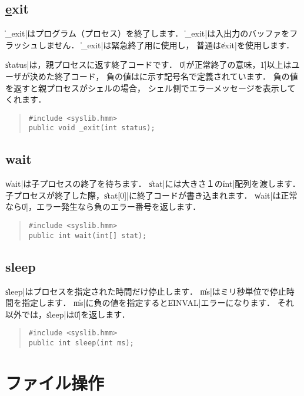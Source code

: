 \subsection{\ul exit}

\|_exit|はプログラム（プロセス）を終了します．
\|_exit|は入出力のバッファをフラッシュしません．
\|_exit|は緊急終了用に使用し，
普通は\|exit|を使用します．

\|status|は，親プロセスに返す終了コードです．
\|0|が正常終了の意味，\|1|以上はユーザが決めた終了コード，
負の値はに示す記号名で定義されています．
負の値を返すと親プロセスがシェルの場合，
シェル側でエラーメッセージを表示してくれます．

\begin{quote}
\begin{verbatim}
#include <syslib.hmm>
public void _exit(int status);
\end{verbatim}
\end{quote}

\subsection{wait}

\|wait|は子プロセスの終了を待ちます．
\|stat|には大きさ１の\|int|配列を渡します．
子プロセスが終了した際，\|stat[0]|に終了コードが書き込まれます．
\|wait|は正常なら\|0|，エラー発生なら負のエラー番号を返します．

\begin{quote}
\begin{verbatim}
#include <syslib.hmm>
public int wait(int[] stat);
\end{verbatim}
\end{quote}

\subsection{sleep}

\|sleep|はプロセスを指定された時間だけ停止します．
\|ms|はミリ秒単位で停止時間を指定します．
\|ms|に負の値を指定すると\|EINVAL|エラーになります．
それ以外では，\|sleep|は\|0|を返します．

\begin{quote}
\begin{verbatim}
#include <syslib.hmm>
public int sleep(int ms);
\end{verbatim}
\end{quote}

\section{ファイル操作}

